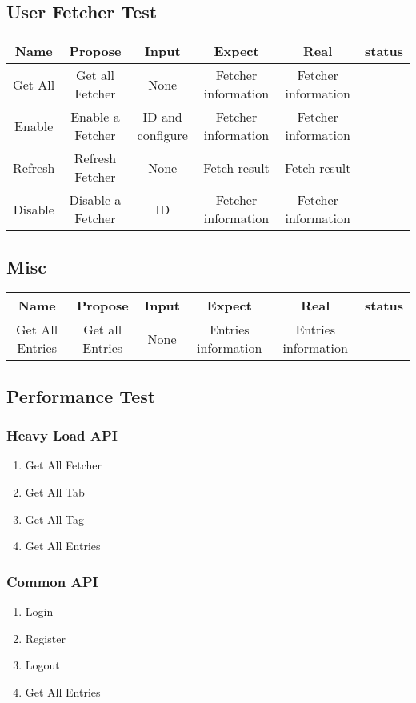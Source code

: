  \subsection{User Fetcher Test}
    \begin{tabular}{c|c|c|c|c|c}
      \hline
      Name & Propose & Input & Expect & Real & status \\ \hline
      Get All & Get all Fetcher & None & Fetcher information & Fetcher information & \\ \hline
      Enable & Enable a Fetcher & ID and configure & Fetcher information & Fetcher information & \\ \hline
      Refresh & Refresh Fetcher & None & Fetch result & Fetch result & \\ \hline
      Disable & Disable a Fetcher & ID & Fetcher information & Fetcher information & \\ \hline
    \end{tabular}
  \subsection{Misc}
    \begin{tabular}{c|c|c|c|c|c}
      \hline
      Name & Propose & Input & Expect & Real & status \\ \hline
      Get All Entries & Get all Entries & None & Entries information & Entries information & \\ \hline
    \end{tabular}
  \subsection{Performance Test}
    \subsubsection{Heavy Load API}
      \begin{enumerate}
        \item Get All Fetcher
        \item Get All Tab
        \item Get All Tag
        \item Get All Entries
      \end{enumerate}
    \subsubsection{Common API}
      \begin{enumerate}
        \item Login
        \item Register
        \item Logout
        \item Get All Entries
      \end{enumerate}
